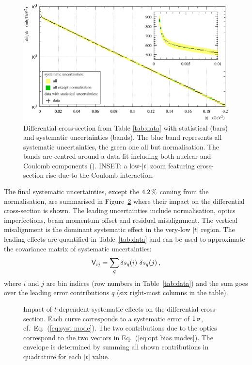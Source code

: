\begin{figure}
\vskip-5mm
\begin{center}
\includegraphics{fig/t_dist_merged_with_unc.pdf}
\caption{%
Differential cross-section from Table \ref{tab:data} with statistical (bars) and systematic uncertainties (bands). The blue band represents all systematic uncertainties, the green one all but normalisation. The bands are centred around a data fit including both nuclear and Coulomb components (). INSET: a low-$|t|$ zoom featuring cross-section rise due to the Coulomb interaction.
}
\label{fig:dsdt}
\end{center}
\end{figure}

The final systematic uncertainties, except the $4.2\,{\rm \%}$ coming from the normalisation, are summarised in Figure~\ref{fig:syst unc} where their impact on the differential cross-section is shown. The leading uncertainties include normalisation, optics imperfections, beam momentum offset and residual misalignment. The vertical misalignment is the dominant systematic effect in the very-low $|t|$ region. The leading effects are quantified in Table~\ref{tab:data} and can be used to approximate the covariance matrix of systematic uncertainties:
\begin{equation}
\label{eq:covar mat}
\mathsf{V}_{ij} = \sum_{q} \delta s_{q}(i)\ \delta s_{q}(j)\: ,
\end{equation}
where $i$ and $j$ are bin indices (row numbers in Table~\ref{tab:data}) and the sum goes over the leading error contributions $q$ (six right-most columns in the table).

\begin{figure}
\begin{center}
\caption{%
Impact of $t$-dependent systematic effects on the differential cross-section. Each curve corresponds to a systematic error of $1\,{\rm \sigma}$, cf.~Eq.~(\ref{eq:syst mode}). The two contributions due to the optics correspond to the two vectors in Eq.~(\ref{eq:opt bias modes}). The envelope is determined by summing all shown contributions in quadrature for each $|t|$ value.
}
\label{fig:syst unc}
\end{center}
\end{figure}

